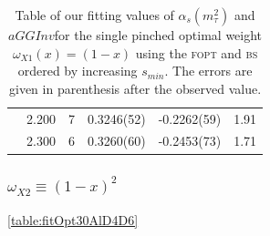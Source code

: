 \documentclass[../../index.tex]{subfiles}
\begin{document}
\begin{table}
\begin{tabular}{llllll}
    & 2.200 & 7 & 0.3246(52) & -0.2262(59) & 1.91 \\
    & 2.300 & 6 & 0.3260(60) & -0.2453(73) & 1.71 \\
    \bottomrule
  \end{tabular}
  \caption{Table of our fitting values of \(\alpha_s(m_\tau^2)\) and
    \(aGGInv\)for the single pinched optimal weight \(\omega_{X1}(x)=(1-x)\)
    using the \textsc{fopt} and \textsc{bs} ordered by increasing \(s_{min}\).
    The errors are given in parenthesis after the observed value.}
  \label{table:fitOpt10AlD4}
\end{table}


\subsubsection{\(\omega_{X2} \equiv (1-x)^2\)}
\cref{table:fitOpt30AlD4D6}
\end{document}
